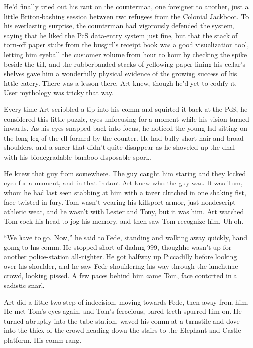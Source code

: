 He’d finally tried out his rant on the counterman, one foreigner to
another, just a little Briton-bashing session between two refugees
from the Colonial Jackboot. To his everlasting surprise, the
counterman had vigorously defended the system, saying that he liked
the PoS data-entry system just fine, but that the stack of torn-off
paper stubs from the busgirl’s receipt book was a good
visualization tool, letting him eyeball the customer volume from
hour to hour by checking the spike beside the till, and the
rubberbanded stacks of yellowing paper lining his cellar’s shelves
gave him a wonderfully physical evidence of the growing success of
his little eatery. There was a lesson there, Art knew, though he’d
yet to codify it. User mythology was tricky that way.

Every time Art scribbled a tip into his comm and squirted it back
at the PoS, he considered this little puzzle, eyes unfocusing for a
moment while his vision turned inwards. As his eyes snapped back
into focus, he noticed the young lad sitting on the long leg of the
ell formed by the counter. He had bully short hair and broad
shoulders, and a sneer that didn’t quite disappear as he shoveled
up the dhal with his biodegradable bamboo disposable spork.

He knew that guy from somewhere. The guy caught him staring and
they locked eyes for a moment, and in that instant Art knew who the
guy was. It was Tom, whom he had last seen stabbing at him with a
tazer clutched in one shaking fist, face twisted in fury. Tom
wasn’t wearing his killsport armor, just nondescript athletic wear,
and he wasn’t with Lester and Tony, but it was him. Art watched Tom
cock his head to jog his memory, and then saw Tom recognize him.
Uh-oh.

“We have to go. Now,” he said to Fede, standing and walking away
quickly, hand going to his comm. He stopped short of dialing 999,
though{\dash}he wasn’t up for another police-station all-nighter. He got
halfway up Piccadilly before looking over his shoulder, and he saw
Fede shouldering his way through the lunchtime crowd, looking
pissed. A few paces behind him came Tom, face contorted in a
sadistic snarl.

Art did a little two-step of indecision, moving towards Fede, then
away from him. He met Tom’s eyes again, and Tom’s ferocious, bared
teeth spurred him on. He turned abruptly into the tube station,
waved his comm at a turnstile and dove into the thick of the crowd
heading down the stairs to the Elephant and Castle platform. His
comm rang.

